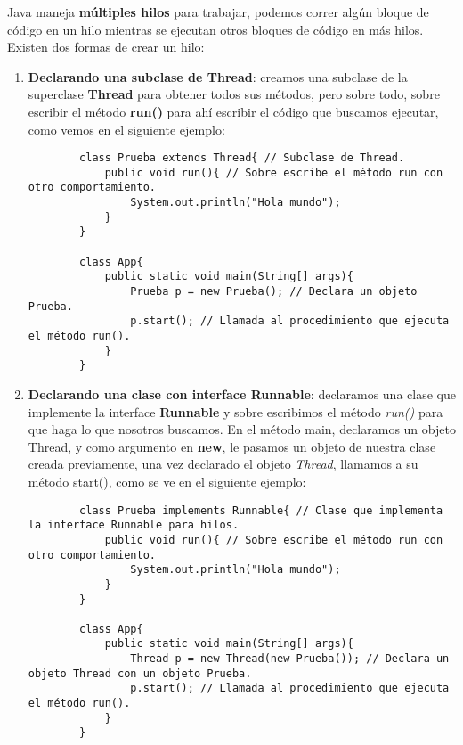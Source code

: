 Java maneja \textbf{múltiples hilos} para trabajar, podemos correr algún bloque de código en un hilo mientras se ejecutan otros bloques de código en más hilos. Existen dos formas de crear un hilo:
\begin{enumerate}
    \item \textbf{Declarando una subclase de Thread}: creamos una subclase de la superclase \textbf{Thread} para obtener todos sus métodos, pero sobre todo, sobre escribir el método \textbf{run()} para ahí escribir el código que buscamos ejecutar, como vemos en el siguiente ejemplo:
    \begin{lstlisting}
        class Prueba extends Thread{ // Subclase de Thread.
            public void run(){ // Sobre escribe el método run con otro comportamiento.
                System.out.println("Hola mundo");
            }
        }
        
        class App{
            public static void main(String[] args){
                Prueba p = new Prueba(); // Declara un objeto Prueba.
                p.start(); // Llamada al procedimiento que ejecuta el método run().
            }
        }
    \end{lstlisting}
    \item \textbf{Declarando una clase con interface Runnable}: declaramos una clase que implemente la interface \textbf{Runnable} y sobre escribimos el método \textit{run()} para que haga lo que nosotros buscamos. En el método main, declaramos un objeto Thread, y como argumento en \textbf{new}, le pasamos un objeto de nuestra clase creada previamente, una vez declarado el objeto \textit{Thread}, llamamos a su método start(), como se ve en el siguiente ejemplo:
    \begin{lstlisting}
        class Prueba implements Runnable{ // Clase que implementa la interface Runnable para hilos.
            public void run(){ // Sobre escribe el método run con otro comportamiento.
                System.out.println("Hola mundo");
            }
        }
        
        class App{
            public static void main(String[] args){
                Thread p = new Thread(new Prueba()); // Declara un objeto Thread con un objeto Prueba.
                p.start(); // Llamada al procedimiento que ejecuta el método run().
            }
        }
    \end{lstlisting}
\end{enumerate}

